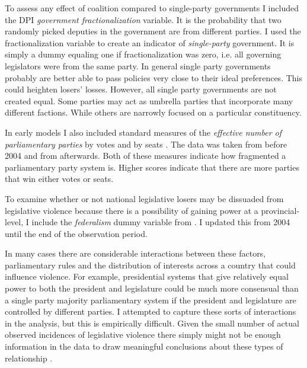 \documentclass[a4paper]{article}\usepackage{graphicx, color}
\begin{document}
To assess any effect of coalition compared to single-party governments I included the DPI {\emph{government fractionalization}} variable. It is the probability that two randomly picked deputies in the government are from different parties. I used the fractionalization variable to create an indicator of {\emph{single-party}} government. It is simply a dummy equaling one if fractionalization was zero, i.e. all governing legislators were from the same party. In general single party governments probably are better able to pass policies very close to their ideal preferences. This could heighten losers' losses. However, all single party governments are not created equal. Some parties may act as umbrella parties that incorporate many different factions. While others are narrowly focused on a particular constituency. 

In early models I also included standard measures of the \emph{effective number of parliamentary parties} by votes and by seats \citep[see][]{Laakso1979, Taagepera1989}. The data was taken from \cite{Carey2011} before 2004 and from \cite{Gallagher2012} afterwards. Both of these measures indicate how fragmented a parliamentary party system is. Higher scores indicate that there are more parties that win either votes or seats.

To examine whether or not national legislative losers may be dissuaded from legislative violence because there is a possibility of gaining power at a provincial-level, I include the \emph{federalism} dummy variable from \cite{Carey2011}. I updated this from 2004 until the end of the observation period.

In many cases there are considerable interactions between these factors, parliamentary rules and the distribution of interests across a country that could influence violence. For example, presidential systems that give relatively equal power to both the president and legislature could be much more consensual than a single party majority parliamentary system if the president and legislature are controlled by different parties. I attempted to capture these sorts of interactions in the analysis, but this is empirically difficult. Given the small number of actual observed incidences of legislative violence there simply might not be enough information in the data to draw meaningful conclusions about these types of relationship \citep[see][]{Brambor2006}.
\end{document}
